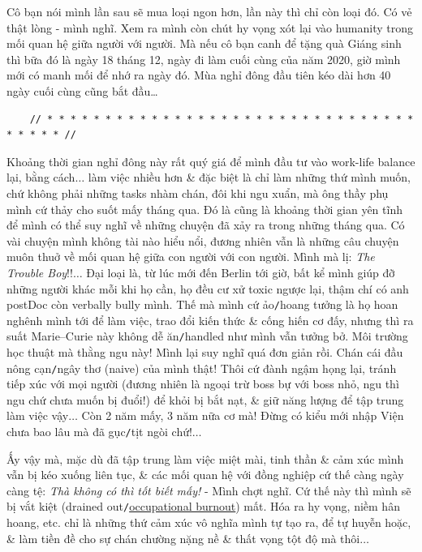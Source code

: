 \documentclass[12pt]{article}
\begin{document}
Cô bạn nói mình lần sau sẽ mua loại ngon hơn, lần này thì chỉ còn loại đó. Có vẻ thật lòng - mình nghĩ. Xem ra mình còn chút hy vọng xót lại vào humanity trong mối quan hệ giữa người với người. Mà nếu cô bạn canh để tặng quà Giáng sinh thì bữa đó là ngày 18 tháng 12, ngày đi làm cuối cùng của năm 2020, giờ mình mới có manh mối để nhớ ra ngày đó. Mùa nghỉ đông đầu tiên kéo dài hơn 40 ngày cuối cùng cũng bắt đầu\ldots

\begin{verbatim}
	// * * * * * * * * * * * * * * * * * * * * * * * * * * * * * * * * * * * * * //
\end{verbatim}

\noindent
{} Khoảng thời gian nghỉ đông này rất quý giá để mình đầu tư vào work-life balance lại, bằng cách$\ldots$ làm việc nhiều hơn \& đặc biệt là chỉ làm những thứ mình muốn, chứ không phải những tasks nhàm chán, đôi khi ngu xuẩn, mà ông thầy phụ mình cứ thảy cho suốt mấy tháng qua. Đó là cũng là khoảng thời gian yên tĩnh để mình có thể suy nghĩ về những chuyện đã xảy ra trong những tháng qua. Có vài chuyện mình không tài nào hiểu nổi, đương nhiên vẫn là những câu chuyện muôn thuở về mối quan hệ giữa con người với con người. Mình mà lị: {\it The Trouble Boy}!!$\ldots$ Đại loại là, từ lúc mới đến Berlin tới giờ, bất kể mình giúp đỡ những người khác mỗi khi họ cần, họ đều cư xử toxic ngược lại, thậm chí có anh postDoc còn verbally bully mình. Thế mà mình cứ ảo{\tt/}hoang tưởng là họ hoan nghênh mình tới để làm việc, trao đổi kiến thức \& cống hiến cơ đấy, nhưng thì ra suất Marie--Curie này không dễ ăn{\tt/}handled như mình vẫn tưởng bở. Môi trường học thuật mà thằng ngu này! Mình lại suy nghĩ quá đơn giản rồi. Chán cái đầu nông cạn{\tt/}ngây thơ (naive) của mình thật! Thôi cứ đành ngậm họng lại, tránh tiếp xúc với mọi người (đương nhiên là ngoại trừ boss bự với boss nhỏ, ngu thì ngu chứ chưa muốn bị đuổi!) để khỏi bị bắt nạt, \& giữ năng lượng để tập trung làm việc vậy$\ldots$ Còn 2 năm mấy, 3 năm nữa cơ mà! Đừng có kiểu mới nhập Viện chưa bao lâu mà đã gục{\tt/}tịt ngòi chứ!$\ldots$

Ấy vậy mà, mặc dù đã tập trung làm việc miệt mài, tinh thần \& cảm xúc mình vẫn bị kéo xuống liên tục, \& các mối quan hệ với đồng nghiệp cứ thế càng ngày càng tệ: {\it Thà không có thì tốt biết mấy!} - Mình chợt nghĩ. Cứ thế này thì mình sẽ bị vắt kiệt (drained out{\tt/}\href{https://en.wikipedia.org/wiki/Occupational_burnout}{occupational burnout}) mất. Hóa ra hy vọng, niềm hân hoang, etc. chỉ là những thứ cảm xúc vô nghĩa mình tự tạo ra, để tự huyễn hoặc, \& làm tiền đề cho sự chán chường nặng nề \& thất vọng tột độ mà thôi$\ldots$
\end{document}
